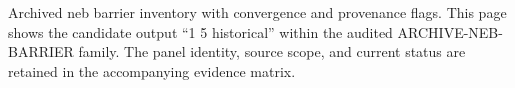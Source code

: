 Archived neb barrier inventory with convergence and provenance flags. This page shows the candidate output ``1 5 historical'' within the audited ARCHIVE-NEB-BARRIER family. The panel identity, source scope, and current status are retained in the accompanying evidence matrix.
